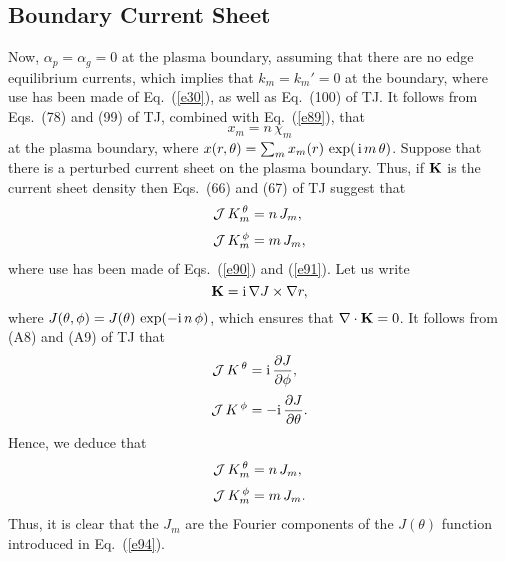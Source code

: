 \documentclass[12pt,prb,aps,notitlepage]{revtex4-1}
\begin{document}
\subsection{Boundary Current Sheet}
Now, $\alpha_p=\alpha_g=0$ at the plasma boundary, assuming that there are no edge equilibrium currents,
which implies that $k_m=k_m'=0$ at the boundary, where use has been made of Eq.~(\ref{e30}),
as well as Eq.~(100) of TJ.  It follows from Eqs.~(78) and (99) of TJ, combined with Eq.~(\ref{e89}),  that 
\begin{equation}\label{e91}
x_m= n\,\chi_m
\end{equation}
at the plasma boundary, where $x(r,\theta)=\sum_m x_m(r)\,\exp(\,{\rm i}\,m\,\theta)$. 
Suppose that there is a perturbed current sheet on the plasma boundary. 
Thus, if ${\bf K}$ is the current sheet density then Eqs.~(66) and (67) of TJ suggest that
\begin{align}
{\cal J}\,K_m^{\,\theta} &=  n\,J_m,\\[0.5ex]
{\cal J}\,K_m^{\,\phi} &=m\,J_m,
\end{align}
where use has been made of Eqs.~(\ref{e90}) and (\ref{e91}). 
Let us write
\begin{equation}\label{e94}
{\bf K} = {\rm i}\,\nabla J\times \nabla r,
\end{equation}
where $J(\theta,\phi)=J(\theta)\,\exp(-{\rm i}\,n\,\phi)$, which ensures that $\nabla\cdot{\bf K}=0$. It follows from (A8) and (A9) of TJ that
\begin{align}
{\cal J}\,K^{\,\theta}&= {\rm i}\,\frac{\partial J}{\partial \phi},\\[0.5ex]
{\cal J}\,K^{\,\phi} &=-{\rm i}\,\frac{\partial J}{\partial\theta}.
\end{align}
Hence, we deduce that 
\begin{align}
{\cal J}\,K^{\,\theta}_m&= n\,J_m,\\[0.5ex]
{\cal J}\,K^{\,\phi}_m &=m\,J_m.
\end{align}
Thus, it is clear that the $J_m$ are the Fourier components of the $J(\theta)$ function introduced in Eq.~(\ref{e94}). 
\end{document}
